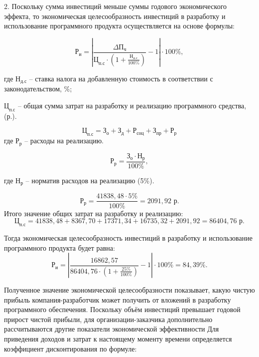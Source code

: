 2. Поскольку сумма инвестиций меньше суммы годового экономического эффекта, то экономическая целесообразность инвестиций в разработку и использование программного продукта осуществляется на основе формулы:

\begin{equation}
\text{Р}_{\text{и}} = |\frac{\text{$\Delta$П}_{\text{ч}}}{\text{Ц}_{\text{п.с}} \cdot (1 + \frac{\text{Н}_{\text{д.с}}}{100\%})} - 1| \cdot 100\%,
\end{equation}

где $\text{Н}_{\text{д.с}}$ -- ставка налога на добавленную стоимость в соответствии с законодательством, {\%};

$\text{Ц}_{\text{п.с}}$ -- общая сумма затрат на разработку и реализацию программного средства, (р.).

\begin{equation}
\text{Ц}_{\text{п.с}} =\text{З}_{\text{о}} + \text{З}_{\text{д}} + \text{Р}_{\text{соц}} + \text{З}_{\text{пр}} + \text{Р}_{\text{р}}
\end{equation}
где $\text{Р}_{\text{р}}$ -- расходы на реализацию.

\begin{equation}
\text{Р}_{\text{р}} = \frac{\text{З}_{\text{о}} \cdot \text{Н}_{\text{р}}}{100\%},
\end{equation}

где $\text{Н}_{\text{р}}$ -- норматив расходов на реализацию (5\%).

\begin{equation}
\text{Р}_{\text{р}} = \frac{41838,48 \cdot 5\%}{100\%} = 2091,92 \text{ р}.
\end{equation}
Итого значение общих затрат на разработку и реализацию:
$$
\text{Ц}_{\text{п.с}} = 41838,48+8367,70+17371,34+16735,32+2091,92 = 86404,76 \text{ р}.
$$


Тогда экономическая целесообразность инвестиций в разработку и использование программного продукта будет равна:
\begin{equation}
\text{Р}_{\text{и}} = |\frac{16862,57 }{86404,76 \cdot (1 + \frac{25\%}{100\%})} - 1| \cdot 100\% = 84, 39 \%.
\end{equation}

Полученное значение экономической целесообразности показывает, какую чистую прибыль компания-разработчик может получить от вложений в разработку программного
обеспечения. Поскольку объём инвестиций превышает годовой прирост чистой прибыли, для организации-заказчика дополнительно рассчитываются
другие показатели экономической эффективности
Для приведения доходов и затрат к настоящему моменту времени
определяется коэффициент дисконтирования по формуле:

